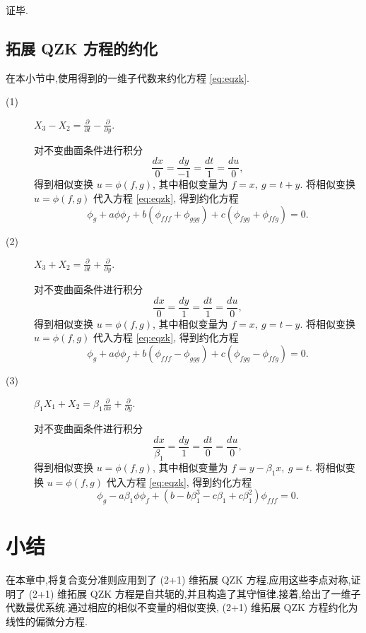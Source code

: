 证毕.

\subsection{拓展 QZK 方程的约化}\label{sec:05reduction}
在本小节中,使用得到的一维子代数来约化方程 \eqref{eq:eqzk}.
\begin{description}

\item[(1)] $X_3-X_2=\frac{\partial}{\partial t}-\frac{\partial}{\partial y}.$

对不变曲面条件进行积分
\begin{equation*}
	\frac{dx}{0}=\frac{dy}{-1}=\frac{dt}{1}=\frac{du}{0},
\end{equation*}
得到相似变换 $u=\phi(f,g)$, 其中相似变量为 $f=x,~g=t+y$.
将相似变换 $u=\phi(f,g)$ 代入方程 \eqref{eq:eqzk}, 得到约化方程
\begin{equation*}
	\phi_g+a\phi \phi_f+b(\phi_{fff}+\phi_{ggg})+c(\phi_{fgg}+\phi_{ffg})=0.
\end{equation*}

\item[(2)]$X_3+X_2=\frac{\partial}{\partial t}+\frac{\partial}{\partial y}.$

对不变曲面条件进行积分
\begin{equation*}
	\frac{dx}{0}=\frac{dy}{1}=\frac{dt}{1}=\frac{du}{0},
\end{equation*}
得到相似变换 $u=\phi(f,g)$, 其中相似变量为 $f=x,~g=t-y$.
将相似变换 $u=\phi(f,g)$ 代入方程 \eqref{eq:eqzk}, 得到约化方程
\begin{equation*}
	\phi_g+a\phi \phi_f+b(\phi_{fff}-\phi_{ggg})+c(\phi_{fgg}-\phi_{ffg})=0.
\end{equation*}

\item[(3)]$\beta_1X_1+X_2=\beta_1\frac{\partial}{\partial x}+\frac{\partial}{\partial y}.$

对不变曲面条件进行积分
\begin{equation*}
	\frac{dx}{\beta_1}=\frac{dy}{1}=\frac{dt}{0}=\frac{du}{0},
\end{equation*}
得到相似变换 $u=\phi(f,g)$, 其中相似变量为 $f=y-\beta_1x,~g=t$.
将相似变换 $u=\phi(f,g)$ 代入方程 \eqref{eq:eqzk}, 得到约化方程
\begin{equation*}
	\phi_g-a\beta_1\phi \phi_f+(b-b\beta_1^3-c\beta_1+c\beta_1^2)\phi_{fff}=0.
\end{equation*}
\end{description}


\section{小结}\label{sec:05conclusion}
在本章中,将复合变分准则应用到了 (2+1) 维拓展 QZK 方程.应用这些李点对称,证明了 (2+1) 维拓展 QZK 方程是自共轭的,并且构造了其守恒律.接着,给出了一维子代数最优系统.通过相应的相似不变量的相似变换, (2+1) 维拓展 QZK 方程约化为线性的偏微分方程.
